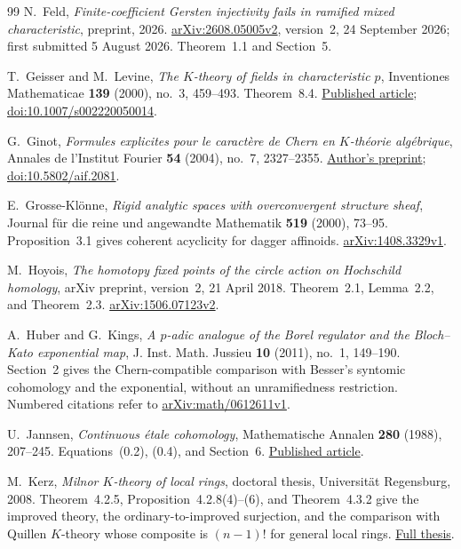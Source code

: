 \begin{thebibliography}{99}
N.~Feld, \emph{Finite-coefficient Gersten injectivity fails in ramified mixed
characteristic}, preprint, 2026.
\href{https://arxiv.org/abs/2608.05005v2}{arXiv:2608.05005v2},
version~2, 24 September 2026; first submitted 5 August 2026.
Theorem~1.1 and Section~5.

T.~Geisser and M.~Levine, \emph{The $K$-theory of fields in
characteristic $p$}, Inventiones Mathematicae \textbf{139}
(2000), no.~3, 459--493. Theorem~8.4.
\href{https://www2.rikkyo.ac.jp/web/geisser/p-part.pdf}{Published article};
\href{https://doi.org/10.1007/s002220050014}{doi:10.1007/s002220050014}.

G.~Ginot, \emph{Formules explicites pour le caract\`ere de Chern en $K$-th\'eorie alg\'ebrique}, Annales de l'Institut Fourier \textbf{54} (2004), no.~7, 2327--2355.
\href{https://www.math.univ-paris13.fr/~ginot/papers/flecarch.pdf}{Author's preprint};
\href{https://doi.org/10.5802/aif.2081}{doi:10.5802/aif.2081}.

E.~Grosse-Kl\"onne, \emph{Rigid analytic spaces with overconvergent structure sheaf}, Journal f\"ur die reine und angewandte Mathematik \textbf{519} (2000), 73--95. Proposition~3.1 gives coherent acyclicity for dagger affinoids.
\href{https://arxiv.org/abs/1408.3329v1}{arXiv:1408.3329v1}.

M.~Hoyois, \emph{The homotopy fixed points of the circle action on
Hochschild homology}, arXiv preprint, version~2, 21 April 2018.
Theorem~2.1, Lemma~2.2, and Theorem~2.3.
\href{https://arxiv.org/abs/1506.07123v2}{arXiv:1506.07123v2}.

A.~Huber and G.~Kings, \emph{A $p$-adic analogue of the Borel regulator and the Bloch--Kato exponential map},
J. Inst. Math. Jussieu \textbf{10} (2011), no.~1, 149--190.
Section~2 gives the Chern-compatible comparison with Besser's
syntomic cohomology and the exponential, without an unramifiedness restriction.
Numbered citations refer to
\href{https://arxiv.org/abs/math/0612611v1}{arXiv:math/0612611v1}.

U.~Jannsen, \emph{Continuous \'etale cohomology}, Mathematische Annalen \textbf{280} (1988), 207--245. Equations~(0.2), (0.4), and Section~6.
\href{https://epub.uni-regensburg.de/26684/1/jannsen12.pdf}{Published article}.

M.~Kerz, \emph{Milnor $K$-theory of local rings}, doctoral thesis, Universit\"at Regensburg, 2008. Theorem~4.2.5, Proposition~4.2.8(4)--(6), and Theorem~4.3.2 give the improved theory, the ordinary-to-improved surjection, and the comparison with Quillen $K$-theory whose composite is $(n-1)!$ for general local rings.
\href{https://d-nb.info/98935329x/34}{Full thesis}.


\end{thebibliography}

